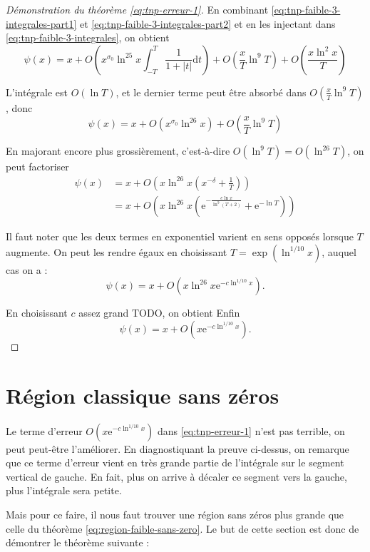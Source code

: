 \documentclass[french]{report}
\begin{document}
\begin{proof}[Démonstration du théorème \ref{eq:tnp-erreur-1}]
  En combinant \ref{eq:tnp-faible-3-integrales-part1} et \ref{eq:tnp-faible-3-integrales-part2} et en les injectant dans \ref{eq:tnp-faible-3-integrales}, on obtient
  \[ \psi(x) = x
  + O\left(x^{\sigma_0}\ln^{25}x\int_{-T}^T\frac{1}{1+|t|}\mathrm{d}t\right)
  + O\left(\frac{x}{T}\ln^9T\right)
  + O\left(\frac{x\ln^2x}{T}\right)
  \]

  L'intégrale est $O(\ln T)$, et le dernier terme peut être absorbé dans $O\left(\frac{x}{T}\ln^9T\right)$, donc
  \[ \psi(x) = x + O(x^{\sigma_0}\ln^{26}x) + O\left(\frac{x}{T}\ln^9T\right) \]

  En majorant encore plus grossièrement, c'est-à-dire $O(\ln^9 T) = O(\ln^26 T)$, on peut factoriser
  \begin{align*}
    \psi(x) &= x + O\left(x\ln^{26} x\left(x^{-\delta}+\frac{1}{T}\right)\right) \\
    &= x + O\left(x\ln^{26} x\left(\mathrm{e}^{-\frac{c\ln x}{\ln^9(T+2)}}+\mathrm{e}^{-\ln T}\right)\right)
  \end{align*}

  Il faut noter que les deux termes en exponentiel varient en sens opposés lorsque $T$ augmente. On peut les rendre égaux en choisissant $T=\exp(\ln^{1/10}x)$, auquel cas on a :
  \[ \psi(x) = x + O(x\ln^{26} x\mathrm{e}^{-c\ln^{1/10}x}). \]

  En choisissant $c$ assez grand TODO, on obtient Enfin
  \[ \psi(x) = x + O(x\mathrm{e}^{-c\ln^{1/10}x}). \]
\end{proof}

\section{Région classique sans zéros}

Le terme d'erreur $O(x\mathrm{e}^{-c\ln^{1/10}x})$ dans \ref{eq:tnp-erreur-1} n'est pas terrible, on peut peut-être l'améliorer. En diagnostiquant la preuve ci-dessus, on remarque que ce terme d'erreur vient en très grande partie de l'intégrale sur le segment vertical de gauche. En fait, plus on arrive à décaler ce segment vers la gauche, plus l'intégrale sera petite.

Mais pour ce faire, il nous faut trouver une région sans zéros plus grande que celle du théorème \ref{eq:region-faible-sans-zero}. Le but de cette section est donc de démontrer le théorème suivante :
\end{document}
